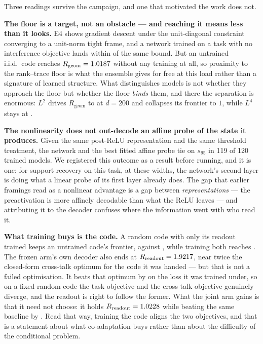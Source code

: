 \documentclass[preprint,12pt]{elsarticle}
\theoremstyle{definition}
\begin{document}
Three readings survive the campaign, and one that motivated the work does not.

\textbf{The floor is a target, not an obstacle --- and reaching it means less than it looks.} E4 shows
gradient descent under the unit-diagonal constraint converging to a unit-norm tight frame, and a
network trained on a task with no interference objective lands within
\EfiveLfourRatioPinvMean{} of the same bound. But an untrained i.i.d.\ code reaches
$R_{\mathrm{geom}}=1.0187{}$ without any training at all, so proximity to the rank--trace
floor is what the ensemble gives for free at this load rather than a signature of learned structure.
What distinguishes models is not whether they approach the floor but whether the floor \emph{binds}
them, and there the separation is enormous: $L^2$ drives $R_{\mathrm{geom}}$ to
\SALtwoTwoHundredRgeom{} at $d=200$ and collapses its frontier to $1$, while $L^4$ stays at
\SALfourTwoHundredRgeom{}.

\textbf{The nonlinearity does not out-decode an affine probe of the state it produces.} Given the same
post-ReLU representation and the same threshold treatment, the network and the best fitted affine
probe tie on $s_{95}$ in 119 of 120 trained models. We registered this outcome as a result before
running, and it is one: for support recovery on this task, at these widths, the network's second layer
is doing what a linear probe of its first layer already does. The gap that earlier framings read as a
nonlinear advantage is a gap between \emph{representations} --- the preactivation is more affinely
decodable than what the ReLU leaves --- and attributing it to the decoder confuses where the
information went with who read it.

\textbf{What training buys is the code.} A random code with only its readout trained keeps an
untrained code's frontier, \EeightFrozenHundredKappa{} against \EeightRandomHundredKappa{}, while
training both reaches \EeightTrainedHundredKappa{}. The frozen arm's own decoder also ends at
$R_{\mathrm{readout}}=1.9217{}$, near twice the closed-form cross-talk optimum
for the code it was handed --- but that is not a failed optimisation. It beats that optimum by
\EeightFrozenHundredTaskGain{} on the loss it was trained under, so on a fixed random code the task
objective and the cross-talk objective genuinely diverge, and the readout is right to follow the
former. What the joint arm gains is that it need not choose: it holds
$R_{\mathrm{readout}}=1.0228{}$ while beating the same baseline by
\EeightTrainedHundredTaskGain{}. Read that way, training the code aligns the two objectives, and
that is a statement about what co-adaptation buys rather than about the difficulty of the
conditional problem.
\end{document}
